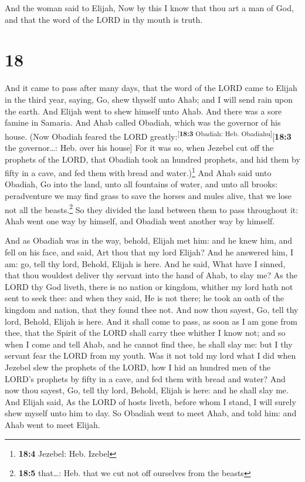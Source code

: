  And the woman said to Elijah, Now by this I know that
thou art a man of God, and that the word of the LORD in thy mouth is
truth.

\hypertarget{section-17}{%
\section{18}\label{section-17}}

 And it came to pass after many days, that the word of the
LORD came to Elijah in the third year, saying, Go, shew thyself unto
Ahab; and I will send rain upon the earth.  And Elijah
went to shew himself unto Ahab. And there was a sore famine in Samaria.
 And Ahab called Obadiah, which was the governor of his
house. (Now Obadiah feared the LORD
greatly:\textsuperscript{{[}\textbf{18:3} Obadiah: Heb.
Obadiahu{]}}{[}\textbf{18:3} the governor\ldots: Heb. over his house{]}
 For it was so, when Jezebel cut off the prophets of the
LORD, that Obadiah took an hundred prophets, and hid them by fifty in a
cave, and fed them with bread and water.)\footnote{\textbf{18:4}
  Jezebel: Heb. Izebel}  And Ahab said unto Obadiah, Go
into the land, unto all fountains of water, and unto all brooks:
peradventure we may find grass to save the horses and mules alive, that
we lose not all the beasts.\footnote{\textbf{18:5} that\ldots: Heb. that
  we cut not off ourselves from the beasts}  So they
divided the land between them to pass throughout it: Ahab went one way
by himself, and Obadiah went another way by himself.

 And as Obadiah was in the way, behold, Elijah met him:
and he knew him, and fell on his face, and said, Art thou that my lord
Elijah?  And he answered him, I am: go, tell thy lord,
Behold, Elijah is here.  And he said, What have I sinned,
that thou wouldest deliver thy servant into the hand of Ahab, to slay
me?  As the LORD thy God liveth, there is no nation or
kingdom, whither my lord hath not sent to seek thee: and when they said,
He is not there; he took an oath of the kingdom and nation, that they
found thee not.  And now thou sayest, Go, tell thy lord,
Behold, Elijah is here.  And it shall come to pass, as
soon as I am gone from thee, that the Spirit of the LORD shall carry
thee whither I know not; and so when I come and tell Ahab, and he cannot
find thee, he shall slay me: but I thy servant fear the LORD from my
youth.  Was it not told my lord what I did when Jezebel
slew the prophets of the LORD, how I hid an hundred men of the LORD's
prophets by fifty in a cave, and fed them with bread and water?
 And now thou sayest, Go, tell thy lord, Behold, Elijah
is here: and he shall slay me.  And Elijah said, As the
LORD of hosts liveth, before whom I stand, I will surely shew myself
unto him to day.  So Obadiah went to meet Ahab, and told
him: and Ahab went to meet Elijah.

